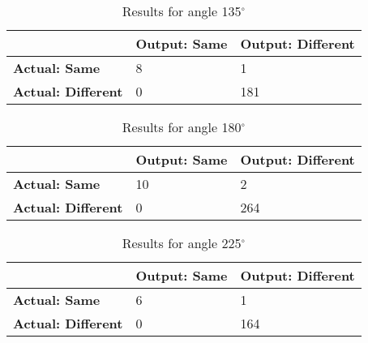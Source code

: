 \begin{table}[H]
    \centering
	\begin{spacing}{1.5}    
    \begin{tabular}{|l|l|l|}
        \hline
        \cellcolor{gray} & \textbf{Output: Same} & \textbf{Output: Different} \\ [0.5ex]
        \hline\hline
        \textbf{Actual: Same} & 8 & 1 \\ [0.5ex]
        \hline
        \textbf{Actual: Different} & 0 & 181 \\ [0.5ex]
        \hline
    \end{tabular}
    \end{spacing}
    \caption{Results for angle 135$^{\circ}$}
\end{table}
            
\begin{table}[H]
    \centering
	\begin{spacing}{1.5}    
    \begin{tabular}{|l|l|l|}
        \hline
        \cellcolor{gray} & \textbf{Output: Same} & \textbf{Output: Different} \\ [0.5ex]
        \hline\hline
        \textbf{Actual: Same} & 10 & 2 \\ [0.5ex]
        \hline
        \textbf{Actual: Different} & 0 & 264 \\ [0.5ex]
        \hline
    \end{tabular}
    \end{spacing}
    \caption{Results for angle 180$^{\circ}$}
\end{table}
            
\begin{table}[H]
    \centering
	\begin{spacing}{1.5}    
    \begin{tabular}{|l|l|l|}
        \hline
        \cellcolor{gray} & \textbf{Output: Same} & \textbf{Output: Different} \\ [0.5ex]
        \hline\hline
        \textbf{Actual: Same} & 6 & 1 \\ [0.5ex]
        \hline
        \textbf{Actual: Different} & 0 & 164 \\ [0.5ex]
        \hline
    \end{tabular}
    \end{spacing}
    \caption{Results for angle 225$^{\circ}$}
\end{table}
            
